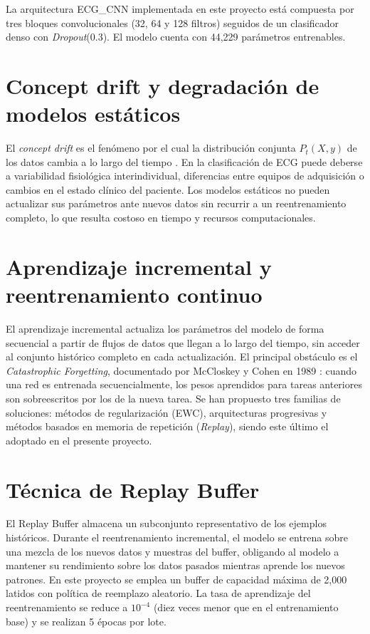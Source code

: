 \documentclass[11pt,spanish]{citedi}
\begin{document}
La arquitectura ECG\_CNN implementada en este proyecto está compuesta por tres bloques convolucionales (32, 64 y 128 filtros) seguidos de un clasificador denso con \textit{Dropout}(0.3). El modelo cuenta con 44,229 parámetros entrenables.

\section{Concept drift y degradación de modelos estáticos}

El \textit{concept drift} es el fenómeno por el cual la distribución conjunta $P_t(X, y)$ de los datos cambia a lo largo del tiempo \cite{Reshad2025}. En la clasificación de ECG puede deberse a variabilidad fisiológica interindividual, diferencias entre equipos de adquisición o cambios en el estado clínico del paciente. Los modelos estáticos no pueden actualizar sus parámetros ante nuevos datos sin recurrir a un reentrenamiento completo, lo que resulta costoso en tiempo y recursos computacionales.

\section{Aprendizaje incremental y reentrenamiento continuo}

El aprendizaje incremental actualiza los parámetros del modelo de forma secuencial a partir de flujos de datos que llegan a lo largo del tiempo, sin acceder al conjunto histórico completo en cada actualización. El principal obstáculo es el \textit{Catastrophic Forgetting}, documentado por McCloskey y Cohen en 1989 \cite{McCloskey1989}: cuando una red es entrenada secuencialmente, los pesos aprendidos para tareas anteriores son sobreescritos por los de la nueva tarea. Se han propuesto tres familias de soluciones: métodos de regularización (EWC), arquitecturas progresivas y métodos basados en memoria de repetición (\textit{Replay}), siendo este último el adoptado en el presente proyecto.

\section{Técnica de Replay Buffer}

El Replay Buffer almacena un subconjunto representativo de los ejemplos históricos. Durante el reentrenamiento incremental, el modelo se entrena sobre una mezcla de los nuevos datos y muestras del buffer, obligando al modelo a mantener su rendimiento sobre los datos pasados mientras aprende los nuevos patrones. En este proyecto se emplea un buffer de capacidad máxima de 2,000 latidos con política de reemplazo aleatorio. La tasa de aprendizaje del reentrenamiento se reduce a $10^{-4}$ (diez veces menor que en el entrenamiento base) y se realizan 5 épocas por lote.
\end{document}
